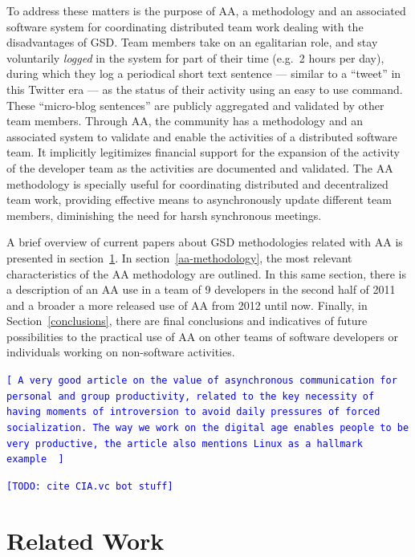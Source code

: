 \documentclass[letterpaper]{article}
\newcommand{\indraftnote}[1]{\textcolor{blue}{\texttt{\footnotesize[#1]}}}
\newcommand{\todo}[1]{\indraftnote{todo: #1}}
\begin{document}
To address these matters is the purpose of AA, a methodology and an associated
software system for coordinating distributed team work dealing with the
disadvantages of GSD. Team members take on an egalitarian role, and stay
voluntarily \textit{logged} in the system for part of their time (e.g.\ 2 hours
per day), during which they log a periodical short text sentence --- similar to
a ``tweet'' in this Twitter era --- as the status of their activity using an
easy to use command. These ``micro-blog sentences'' are publicly aggregated and
validated by other team members. Through AA, the community has a methodology and
an associated system to validate and enable the activities of a distributed
software team. It implicitly legitimizes financial support for the expansion of
the activity of the developer team as the activities are documented and
validated.  The AA methodology is specially useful for coordinating distributed
and decentralized team work, providing effective means to asynchronously update
different team members, diminishing the need for harsh synchronous meetings.


A brief overview of current papers about GSD methodologies related with AA is
presented in section~\ref{related-work}. In section~\ref{aa-methodology}, the
most relevant characteristics of the AA methodology are outlined. In this same
section, there is a description of an AA use in a team of 9 developers in the
second half of 2011 and a broader a more released use of AA from 2012 until
now. Finally, in Section~\ref{conclusions}, there are final conclusions and
indicatives of future possibilities to the practical use of AA on other teams of
software developers or individuals working on non-software activities.

\indraftnote{
A very good article on the value of asynchronous communication for personal
and group productivity, related to the key necessity of having moments of
introversion to avoid daily pressures of forced socialization. The way we work
on the digital age enables people to be very productive, the article also
mentions Linux as a hallmark example~\cite{Thompson:Wired:2012}
}

\indraftnote{TODO: cite CIA.vc bot stuff}

\section{Related Work}
\label{related-work}
\end{document}

